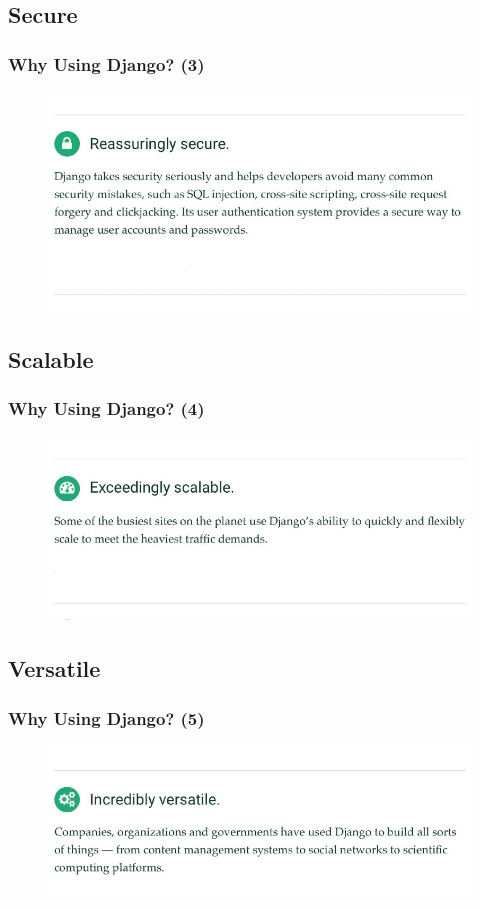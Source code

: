 \documentclass{beamer}
\begin{document}
\subsection{Secure}
\begin{frame}
\frametitle{Why Using Django? (3)}
\begin{figure}
	\includegraphics[width=0.8\linewidth]{Pics/Django/index3.jpeg}
\end{figure}
\end{frame}

\subsection{Scalable}
\begin{frame}
\frametitle{Why Using Django? (4)}
\begin{figure}
	\includegraphics[width=0.8\linewidth]{Pics/Django/index4.jpeg}
\end{figure}
\end{frame}

\subsection{Versatile}
\begin{frame}
\frametitle{Why Using Django? (5)}
\begin{figure}
	\includegraphics[width=0.8\linewidth]{Pics/Django/index5.jpeg}
\end{figure}
\end{frame}
\end{document}

